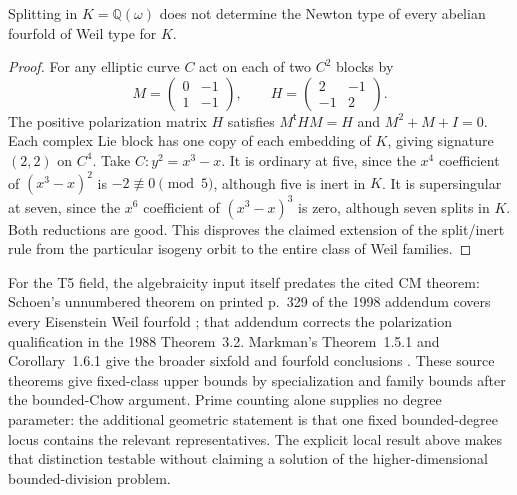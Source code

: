 \begin{proposition}
\label{prop:P03}
Splitting in $K=\mathbb Q(\omega)$ does not determine the Newton type of every abelian fourfold of Weil type for $K$.
\end{proposition}
\begin{proof}
For any elliptic curve $C$ act on each of two $C^2$ blocks by
\[
 M=\begin{pmatrix}0&-1\\1&-1\end{pmatrix},\qquad
 H=\begin{pmatrix}2&-1\\-1&2\end{pmatrix}.
\]
The positive polarization matrix $H$ satisfies $M^{\mathsf t}HM=H$ and $M^2+M+I=0$.  Each complex Lie block has one copy of each embedding of $K$, giving signature $(2,2)$ on $C^4$.  Take $C:y^2=x^3-x$.  It is ordinary at five, since the $x^4$ coefficient of $(x^3-x)^2$ is $-2\not\equiv0\pmod5$, although five is inert in $K$.  It is supersingular at seven, since the $x^6$ coefficient of $(x^3-x)^3$ is zero, although seven splits in $K$.  Both reductions are good.  This disproves the claimed extension of the split/inert rule from the particular isogeny orbit to the entire class of Weil families.
\end{proof}

For the T5 field, the algebraicity input itself predates the cited CM theorem: Schoen's unnumbered theorem on printed p.~329 of the 1998 addendum covers every Eisenstein Weil fourfold \cite{Schoen1998}; that addendum corrects the polarization qualification in the 1988 Theorem~3.2.  Markman's Theorem~1.5.1 and Corollary~1.6.1 give the broader sixfold and fourfold conclusions \cite{Markman2025}.  These source theorems give fixed-class upper bounds by specialization and family bounds after the bounded-Chow argument.  Prime counting alone supplies no degree parameter: the additional geometric statement is that one fixed bounded-degree locus contains the relevant representatives.  The explicit local result above makes that distinction testable without claiming a solution of the higher-dimensional bounded-division problem.
